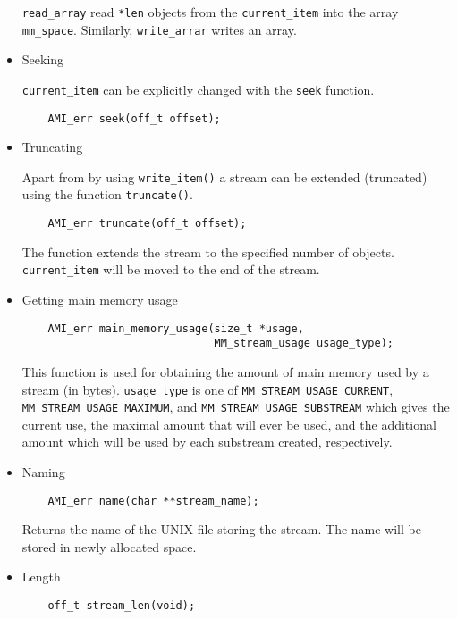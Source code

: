 \begin{itemize}
\verb|read_array| read \verb|*len| objects from the \verb|current_item| into
the array \verb|mm_space|. Similarly, \verb|write_arrar| writes an
array.

\item{Seeking}

\verb|current_item| can be explicitly changed with the \verb|seek| function.
\begin{verbatim}
    AMI_err seek(off_t offset);
\end{verbatim}

\item{Truncating}

Apart from by using \verb|write_item()| a stream can be extended
(truncated) using the function \verb|truncate()|.

\begin{verbatim}
    AMI_err truncate(off_t offset);
\end{verbatim}
The function extends the stream to the specified number of
objects. \verb|current_item| will be moved to the end of the stream.

\item{Getting main memory usage}

\begin{verbatim}
    AMI_err main_memory_usage(size_t *usage,
                              MM_stream_usage usage_type);
\end{verbatim}

This function is used for obtaining the amount of main memory used by a
stream (in bytes). \verb|usage_type| is one of
\verb|MM_STREAM_USAGE_CURRENT|, \verb|MM_STREAM_USAGE_MAXIMUM|, and
\verb|MM_STREAM_USAGE_SUBSTREAM| which gives the current use, the maximal
amount that will ever be used, and the additional amount which will be used
by each substream created, respectively.

\item{Naming}

\begin{verbatim}
    AMI_err name(char **stream_name);
\end{verbatim}

Returns the name of the UNIX file storing the stream.  The
name will be stored in newly allocated space.

\item{Length}

\begin{verbatim}
    off_t stream_len(void);
\end{verbatim}


\end{itemize}
